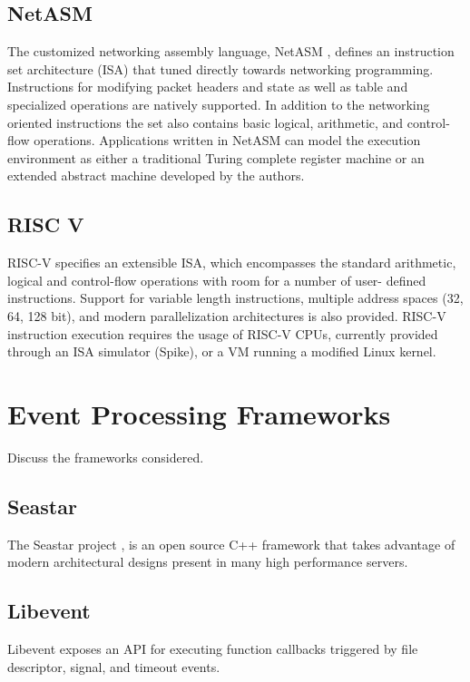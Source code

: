 \subsection{NetASM}
\label{related:netasm}
The customized networking assembly language, NetASM \cite{netasm}, defines an
instruction set architecture (ISA) that tuned directly towards networking
programming. Instructions for modifying packet headers and state as well
as table and specialized operations are natively supported. In addition to the
networking oriented instructions the set also contains basic logical,
arithmetic, and control-flow operations. Applications written in NetASM can
model the execution environment as either a traditional Turing complete
register machine or an extended abstract machine developed by the authors.

\subsection{RISC V}
\label{related:riscv}
RISC-V \cite{riscv} specifies an extensible ISA, which encompasses the standard
arithmetic, logical and control-flow operations with room for a number of user-
defined instructions. Support for variable length instructions, multiple
address spaces (32, 64, 128 bit), and modern parallelization architectures is
also provided. RISC-V instruction execution requires the usage of RISC-V CPUs,
currently provided through an ISA simulator (Spike), or a VM running a modified
Linux kernel.

\section{Event Processing Frameworks}
\label{related:event}
Discuss the frameworks considered.

\subsection{Seastar}
\label{related:seastar}
The Seastar project \cite{seastar}, is an open source C++ framework that
takes advantage of modern architectural designs present in many high
performance servers.

\subsection{Libevent}
\label{related:libevent}
Libevent \cite{libevent} exposes an API for executing function callbacks
triggered by file descriptor, signal, and timeout events.
